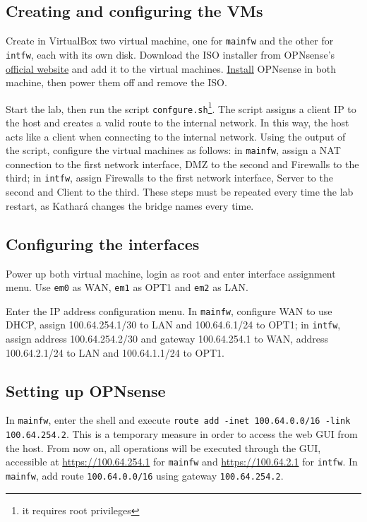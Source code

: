 \documentclass[draft]{homework}
\newcommand{\intfw}{\texttt{intfw}\xspace}
\newcommand{\kat}{Kathará\xspace}
\newcommand{\mainfw}{\texttt{mainfw}\xspace}
\newcommand{\opn}{OPNsense\xspace}
\newcommand{\vb}{VirtualBox\xspace}
\begin{document}
    \subsection{Creating and configuring the VMs}
    Create in \vb two virtual machine, one for \mainfw and the other for \intfw, each with its own disk. Download the ISO installer from \opn's \href{https://opnsense.org/download/}{official website} and add it to the virtual machines. \href{https://docs.opnsense.org/manual/install.html}{Install} \opn in both machine, then power them off and remove the ISO.
    
    Start the lab, then run the script \texttt{confgure.sh}\footnote{it requires root privileges}. The script assigns a client IP to the host and creates a valid route to the internal network. In this way, the host acts like a client when connecting to the internal network. Using the output of the script, configure the virtual machines as follows: in \mainfw, assign a NAT connection to the first network interface, DMZ to the second and Firewalls to the third; in \intfw, assign Firewalls to the first network interface, Server to the second and Client to the third. These steps must be repeated every time the lab restart, as \kat changes the bridge names every time.
    
    \subsection{Configuring the interfaces}
    Power up both virtual machine, login as root and enter interface assignment menu. Use \texttt{em0} as WAN, \texttt{em1} as OPT1 and \texttt{em2} as LAN.
    
    Enter the IP address configuration menu. In \mainfw, configure WAN to use DHCP, assign 100.64.254.1/30 to LAN and 100.64.6.1/24 to OPT1; in \intfw, assign address 100.64.254.2/30 and gateway 100.64.254.1 to WAN, address 100.64.2.1/24 to LAN and 100.64.1.1/24 to OPT1.
    
    \subsection{Setting up \opn}
    In \mainfw, enter the shell and execute \texttt{route add -inet 100.64.0.0/16 -link \\ 100.64.254.2}. This is a temporary measure in order to access the web GUI from the host. From now on, all operations will be executed through the GUI, accessible at \url{https://100.64.254.1} for \mainfw and \url{https://100.64.2.1} for \intfw. In \mainfw, add route \texttt{100.64.0.0/16} using gateway \texttt{100.64.254.2}.
    
\end{document}
